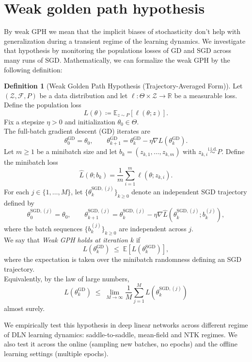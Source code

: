 \documentclass{article}
\theoremstyle{definition}
\newtheorem{definition}[theorem]{Definition}
\begin{document}
\section{Weak golden path hypothesis}
By weak GPH we mean that the implicit biases of stochasticity don't help with generalization during a transient regime of the learning dynamics. We investigate that hypothesis by monitoring the populations losses of GD and SGD across many runs of SGD. Mathematically, we can formalize the weak GPH by the following definition:
\begin{definition}[Weak Golden Path Hypothesis (Trajectory-Averaged Form)]
Let $(\mathcal Z,\mathcal F,P)$ be a data distribution and let 
$\ell:\Theta\times\mathcal Z\to\mathbb R$ be a measurable loss.
Define the population loss
\[
L(\theta) \coloneqq \mathbb E_{z\sim P}[\ell(\theta;z)] .
\]
Fix a stepsize $\eta>0$ and initialization $\theta_0\in\Theta$.
\\
The full-batch gradient descent (GD) iterates are
\[
\theta^{\mathrm{GD}}_{0}=\theta_0,
\qquad
\theta^{\mathrm{GD}}_{k+1}
=
\theta^{\mathrm{GD}}_{k}
-
\eta \nabla L(\theta^{\mathrm{GD}}_{k}).
\]
Let $m\ge1$ be a minibatch size and let
$b_k=(z_{k,1},\dots,z_{k,m})$ with $z_{k,i}\overset{\text{i.i.d.}}{\sim}P$.
Define the minibatch loss
\[
\widehat L(\theta;b_k)
=
\frac1m \sum_{i=1}^m \ell(\theta;z_{k,i}).
\]
For each $j\in\{1,\dots,M\}$, let 
$\{\theta^{\mathrm{SGD},(j)}_k\}_{k\ge0}$ denote an independent SGD trajectory
defined by
\[
\theta^{\mathrm{SGD},(j)}_{0}=\theta_0,
\qquad
\theta^{\mathrm{SGD},(j)}_{k+1}
=
\theta^{\mathrm{SGD},(j)}_{k}
-
\eta \nabla \widehat L(\theta^{\mathrm{SGD},(j)}_{k}; b^{(j)}_k),
\]
where the batch sequences $\{b^{(j)}_k\}_{k\ge0}$ are independent across $j$.
\\
We say that \emph{Weak GPH holds at iteration $k$} if
\[
L(\theta^{\mathrm{GD}}_{k})
\;\le\;
\mathbb E\!\left[
L(\theta^{\mathrm{SGD}}_{k})
\right],
\]
where the expectation is taken over the minibatch randomness
defining an SGD trajectory.
\\
Equivalently, by the law of large numbers,
\[
L(\theta^{\mathrm{GD}}_{k})
\;\le\;
\lim_{M\to\infty}
\frac1M
\sum_{j=1}^M
L\!\left(\theta^{\mathrm{SGD},(j)}_{k}\right)
\]
almost surely.
\end{definition}
We empirically test this hypothesis in deep linear networks across different regime of DLN learning dynamics: saddle-to-saddle, mean-field and NTK regimes. We also test it across the online (sampling new batches, no epochs) and the offline learning settings (multiple epochs). 
\end{document}
